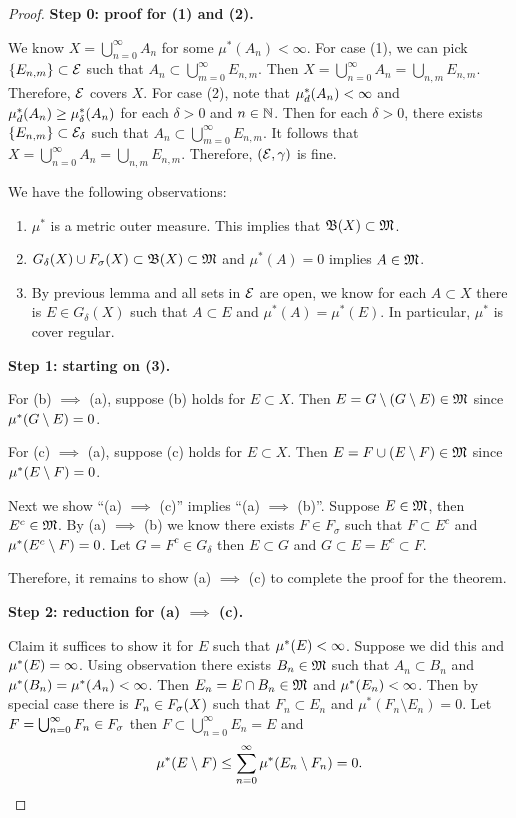 \documentclass[a4paper]{article}
\renewcommand{\cupinfn}{\bigcup_{n=0}^\infty}
\renewcommand{\suminfn}{\sum_{n=0}^\infty}
\begin{document}
\begin{proof}

\textbf{Step 0: proof for (1) and (2).}

We know $X = \cupinfn A_n$ for some $\mu^*
(A_n) < \infty$. For case (1), we can pick $\left\{ E_{n, m} \right\}
\subset \mathcal{E}$
such that $A_n \subset \bigcup_{m=0}^\infty E_{n, m}$. Then
$X = \cupinfn A_n = \bigcup_{n, m} E_{n, m}$. Therefore,
$\mathcal{E}$ covers $X$.
For case (2), note that $\mu^*_d(A_n) < \infty$
and $\mu^*_d(A_n) \geq \mu^*_\delta(A_n)$
for each $\delta > 0$ and $n \in \mathbb{N}$.
Then for each $\delta > 0$,
there exists $\left\{ E_{n, m} \right\} \subset \mathcal{E}_\delta$
such that $A_n \subset \bigcup_{m=0}^\infty E_{n, m}$.
It follows that
$X = \cupinfn A_n = \bigcup_{n, m} E_{n, m}$. Therefore,
$(\mathcal{E}, \gamma)$ is fine.

We have the following observations:
\begin{enumerate}
  \item $\mu^*$ is a metric outer measure. This implies that
  $\mathfrak{B}(X) \subset \mathfrak{M}$.
  \item $G_\delta(X) \cup F_\sigma(X) \subset \mathfrak{B}(X) \subset \mathfrak{M}$
  and $\mu^*(A) = 0$ implies $A \in \mathfrak{M}$.
  \item By previous lemma and all sets in $\mathcal{E}$ are open,
  we know for each $A \subset X$ there is $E \in G_\delta(X)$
  such that $A \subset E$ and $\mu^*(A) = \mu^*(E)$.
  In particular, $\mu^*$ is cover regular.
\end{enumerate}

\textbf{Step 1: starting on (3).}

For (b) $\implies$ (a), suppose (b) holds for $E \subset X$.
Then $E = G \setminus (G \setminus E) \in \mathfrak{M}$ since
$\mu^*(G \setminus E) = 0$.

For (c) $\implies$ (a), suppose (c) holds for $E \subset X$.
Then $E = F \cup (E \setminus F) \in \mathfrak{M}$ since
$\mu^*(E \setminus F) = 0$.

Next we show ``(a) $\implies$ (c)'' implies
``(a) $\implies$ (b)''. Suppose $E \in \mathfrak{M}$, then
$E^c \in \mathfrak{M}$. By (a) $\implies$ (b) we know there exists
$F \in F_\sigma$ such that $F \subset E^c$ and
$\mu^*(E^c \setminus F) = 0$. Let $G = F^c \in G_\delta$
then $E \subset G$ and $G \subset E = E^c \subset F$.

Therefore, it remains to show (a) $\implies$ (c) to complete
the proof for the theorem.

\textbf{Step 2: reduction for (a) $\implies$ (c).}

Claim it suffices to show it for $E$ such that $\mu^*(E) < \infty$.
Suppose we did this and $\mu^*(E) = \infty$. Using observation
there exists $B_n \in \mathfrak{M}$ such that $A_n \subset B_n$
and $\mu^*(B_n) = \mu^* (A_n) < \infty$. Then $E_n = E \cap B_n
\in \mathfrak{M}$ and $\mu^*(E_n) < \infty$. Then by special case there
is $F_n \in F_\sigma(X)$ such that $F_n \subset E_n$ and
$\mu^*(F_n \setminus E_n) = 0$. Let $F = \cupinfn F_n \in \fs$
then $F \subset \cupinfn E_n = E$ and
\[
\om(E \setminus F) \leq \suminfn \om (E_n \setminus F_n) = 0.
\]


\end{proof}
\end{document}
